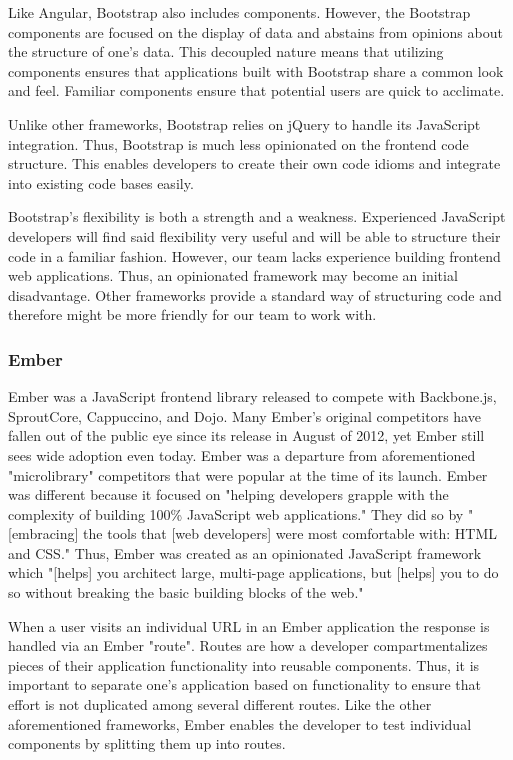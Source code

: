 \documentclass[12pt]{report}
\begin{document}
Like Angular, Bootstrap also includes components. However, the Bootstrap components are focused on the display of data and abstains from opinions about the structure of one's data. This decoupled nature means that utilizing components ensures that applications built with Bootstrap share a common look and feel. Familiar components ensure that potential users are quick to acclimate.

Unlike other frameworks, Bootstrap relies on jQuery to handle its JavaScript integration.\cite{bootstrapjs} Thus, Bootstrap is much less opinionated on the frontend code structure. This enables developers to create their own code idioms and integrate into existing code bases easily.

Bootstrap's flexibility is both a strength and a weakness. Experienced JavaScript developers will find said flexibility very useful and will be able to structure their code in a familiar fashion. However, our team lacks experience building frontend web applications. Thus, an opinionated framework may become an initial disadvantage. Other frameworks provide a standard way of structuring code and therefore might be more friendly for our team to work with.

\subsubsection*{Ember}

Ember was a JavaScript frontend library released to compete with Backbone.js, SproutCore, Cappuccino, and Dojo.\cite{emberrelease} Many Ember's original competitors have fallen out of the public eye since its release in August of 2012, yet Ember still sees wide adoption even today. Ember was a departure from aforementioned "microlibrary" competitors that were popular at the time of its launch. Ember was different because it focused on "helping developers grapple with the complexity of building 100\% JavaScript web applications."\cite{emberrelease} They did so by "[embracing] the tools that [web developers] were most comfortable with: HTML and CSS."\cite{emberrelease} Thus, Ember was created as an opinionated JavaScript framework which "[helps] you architect large, multi-page applications, but [helps] you to do so without breaking the basic building blocks of the web."\cite{emberrelease}

When a user visits an individual URL in an Ember application the response is handled via an Ember "route".\cite{emberrouting} Routes are how a developer compartmentalizes pieces of their application functionality into reusable components. Thus, it is important to separate one's application based on functionality to ensure that effort is not duplicated among several different routes. Like the other aforementioned frameworks, Ember enables the developer to test individual components by splitting them up into routes.
\end{document}
